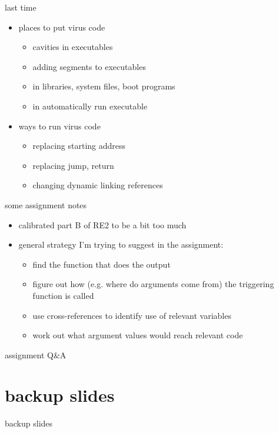 \date{}
\title{}
\date{}

\begin{frame}
    \titlepage
\end{frame}



\begin{frame}{last time}
    \begin{itemize}
    \item places to put virus code
        \begin{itemize}
        \item cavities in executables
        \item adding segments to executables
        \item in libraries, system files, boot programs
        \item in automatically run executable
        \end{itemize}
    \item ways to run virus code
        \begin{itemize}
        \item replacing starting address
        \item replacing jump, return
        \item changing dynamic linking references
        \end{itemize}
    \end{itemize}
\end{frame}

\begin{frame}{some assignment notes}
    \begin{itemize}
    \item calibrated part B of RE2 to be a bit too much
    \vspace{.5cm}
    \item general strategy I'm trying to suggest in the assignment:
        \begin{itemize}
        \item find the function that does the output
        \item figure out how (e.g. where do arguments come from) the triggering function is called
        \item use cross-references to identify use of relevant variables
        \item work out what argument values would reach relevant code
        \end{itemize}
    \end{itemize}
\end{frame}

\begin{frame}{assignment Q\&A}
\end{frame}



\section{backup slides}
\begin{frame}{backup slides}
\end{frame}


